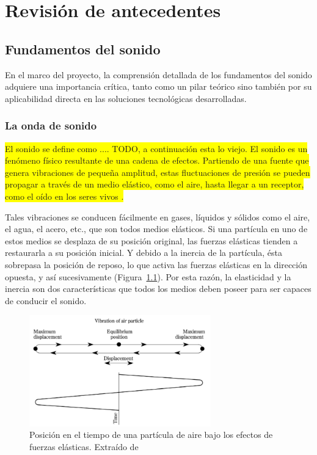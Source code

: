 \documentclass{prgrado}
\begin{document}

\chapter{Revisión de antecedentes} 

\section{Fundamentos del sonido}

En el marco del proyecto, la comprensión detallada de los fundamentos del sonido adquiere una importancia crítica, tanto como un pilar teórico sino también por su aplicabilidad directa en las soluciones tecnológicas desarrolladas.

\subsection{La onda de sonido}

\colorbox{yellow}{El sonido se define como .... TODO, a continuación esta lo viejo. El sonido es un fenómeno físico resultante de una cadena de efectos. Partiendo de una fuente que genera vibraciones de pequeña amplitud, estas fluctuaciones de presión se pueden propagar a través de un medio elástico, como el aire, hasta llegar a un receptor, como el oído en los seres vivos \cite{Moser}.}

Tales vibraciones se conducen fácilmente en gases, líquidos y sólidos como el aire, el agua, el acero, etc., que son todos medios elásticos. Si una partícula en uno de estos medios se desplaza de su posición original, las fuerzas elásticas tienden a restaurarla a su posición inicial. Y debido a la inercia de la partícula, ésta sobrepasa la posición de reposo, lo que activa las fuerzas elásticas en la dirección opuesta, y así sucesivamente (Figura~\ref{fig:vibracion}). Por esta razón, la elasticidad y la inercia son dos características que todos los medios deben poseer para ser capaces de conducir el sonido.

\begin{figure}[h!]
    \centering
    \includegraphics[width=0.7\textwidth]{figs/vibration-of-air-particle.png}
    \captionsetup{justification=centering}
    \caption{Posición en el tiempo de una partícula de aire bajo los efectos de fuerzas elásticas. Extraído de \cite{Everest}}
    \label{fig:vibracion}
\end{figure}
\end{document}
